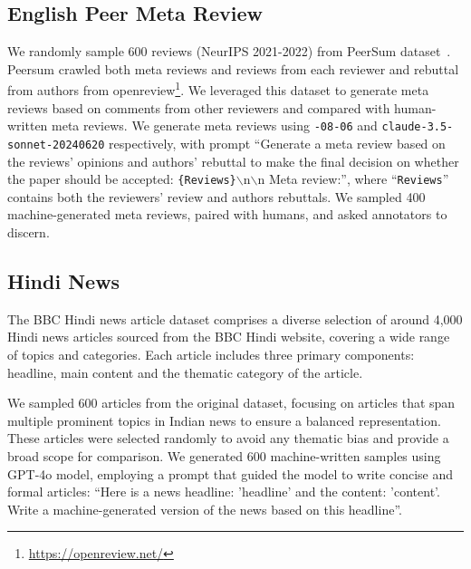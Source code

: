 \subsection{English Peer Meta Review}
We randomly sample 600 reviews (NeurIPS 2021-2022) from PeerSum dataset~\citep{peersum_2023}. 
Peersum crawled both meta reviews and reviews from each reviewer and rebuttal from authors from openreview\footnote{\url{https://openreview.net/}}. 
We leveraged this dataset to generate meta reviews based on comments from other reviewers and compared with human-written meta reviews.
We generate meta reviews using \texttt{-08-06} and \texttt{claude-3.5-sonnet-20240620} respectively, with prompt ``Generate a meta review based on the reviews' opinions and authors' rebuttal to make the final decision on whether the paper should be accepted: \texttt{\{Reviews\}}$\backslash $n$\backslash$n Meta review:'', where ``\texttt{Reviews}'' contains both the reviewers' review and authors rebuttals. 
We sampled 400 machine-generated meta reviews, paired with humans, and asked annotators to discern. 






\subsection{Hindi News}
The BBC Hindi news article dataset comprises a diverse selection of around 4,000 Hindi news articles sourced from the BBC Hindi website, covering a wide range of topics and categories. Each article includes three primary components: headline, main content and the thematic category of the article.

We sampled 600 articles from the original dataset, focusing on articles that span multiple prominent topics in Indian news to ensure a balanced representation. These articles were selected randomly to avoid any thematic bias and provide a broad scope for comparison.
We generated 600 machine-written samples using GPT-4o model, employing a prompt that guided the model to write concise and formal articles: ``Here is a news headline: '{headline}' and the content: '{content}'. Write a machine-generated version of the news based on this headline''.


